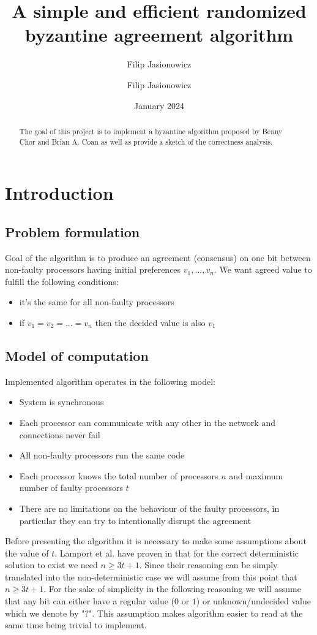 \documentclass{article}
\title{A simple and efficient randomized byzantine agreement algorithm}
\author{Filip Jasionowicz}
\author{Filip Jasionowicz}
\date{January 2024}
\begin{document}
\maketitle

\begin{abstract}
    The goal of this project is to implement a byzantine algorithm proposed by Benny Chor and Brian A. Coan \cite{chor1985simple} as well as provide a sketch of the correctness analysis.
\end{abstract}

\section{Introduction}

\subsection{Problem formulation}
Goal of the algorithm is to produce an agreement (consensus) on one bit between non-faulty processors having initial preferences $v_1,...,v_n$. We want agreed value to fulfill the following conditions:
\begin{itemize}
    \item it's the same for all non-faulty processors
    \item if $v_1=v_2=...=v_n$ then the decided value is also $v_1$ 
\end{itemize}

\subsection{Model of computation}
Implemented algorithm operates in the following model:
\begin{itemize}
    \item System is synchronous
    \item Each processor can communicate with any other in the network and connections never fail
    \item All non-faulty processors run the same code
    \item Each processor knows the total number of processors $n$ and maximum number of faulty processors $t$
    \item There are no limitations on the behaviour of the faulty processors, in particular they can try to intentionally disrupt the agreement
\end{itemize}
Before presenting the algorithm it is necessary to make some assumptions about the value of $t$. Lamport et al. have proven in \cite{pease1982byzantine} that for the correct deterministic solution to exist we need $n \geq 3t +1$. Since their reasoning can be simply translated into the non-deterministic case we will assume from this point that $n \geq 3t +1$. For the sake of simplicity in the following reasoning we will assume that any bit can either have a regular value ($0$ or $1$) or unknown/undecided value which we denote by "$?$". This assumption makes algorithm easier to read at the same time being trivial to implement.
\end{document}

